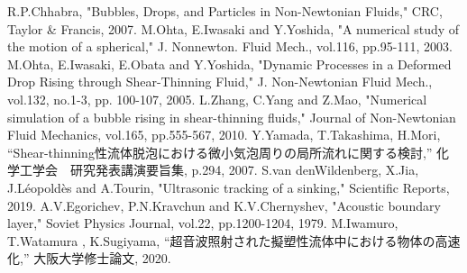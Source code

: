 \begin{thebibliography}{99}
     R.P.Chhabra, "Bubbles, Drops, and Particles in Non-Newtonian Fluids," CRC, Taylor \& Francis, 2007.
     M.Ohta, E.Iwasaki and Y.Yoshida, "A numerical study of the motion of a spherical," J. Nonnewton. Fluid Mech., vol.116, pp.95-111, 2003.
     M.Ohta, E.Iwasaki, E.Obata and Y.Yoshida, "Dynamic Processes in a Deformed Drop Rising through Shear-Thinning Fluid," J. Non-Newtonian Fluid Mech., vol.132, no.1-3, pp. 100-107, 2005.
     L.Zhang, C.Yang and Z.Mao, "Numerical simulation of a bubble rising in shear-thinning fluids," Journal of Non-Newtonian Fluid Mechanics, vol.165, pp.555-567, 2010.
     Y.Yamada, T.Takashima, H.Mori, “Shear-thinning性流体脱泡における微小気泡周りの局所流れに関する検討,” 化学工学会　研究発表講演要旨集, p.294, 2007.
     S.van denWildenberg, X.Jia, J.Léopoldès and A.Tourin, "Ultrasonic tracking of a sinking," Scientific Reports, 2019.
     A.V.Egorichev, P.N.Kravchun and K.V.Chernyshev, "Acoustic boundary layer," Soviet Physics Journal, vol.22, pp.1200-1204, 1979.
     M.Iwamuro, T.Watamura , K.Sugiyama, “超音波照射された擬塑性流体中における物体の高速化,” 大阪大学修士論文, 2020.
\end{thebibliography}